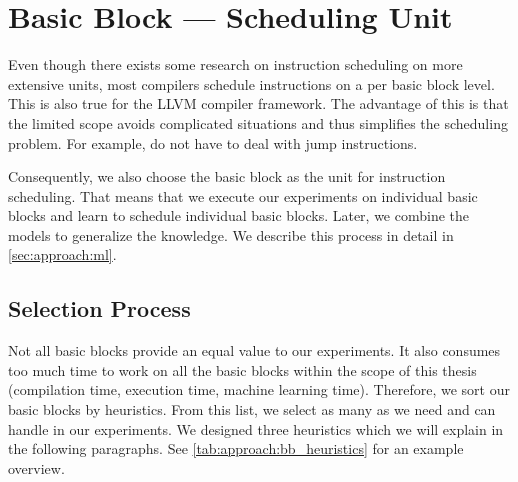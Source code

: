 \section{Basic Block --- Scheduling Unit}
\label{sec:approach:basicblock}
Even though there exists some research  on instruction scheduling on more extensive units, most compilers schedule instructions on a per basic block level.
This is also true for the LLVM compiler framework.
The advantage of this is that the limited scope avoids complicated situations and thus simplifies the scheduling problem.
For example, do not have to deal with jump instructions.

Consequently, we also choose the basic block as the unit for instruction scheduling.
That means that we execute our experiments on individual basic blocks and learn to schedule individual basic blocks.
Later, we combine the models to generalize the knowledge.
We describe this process in detail in \cref{sec:approach:ml}.

\subsection{Selection Process}
\label{sec:approach:basicblock:selection}
Not all basic blocks provide an equal value to our experiments.
It also consumes too much time to work on all the basic blocks within the scope of this thesis (\eg compilation time, execution time, machine learning time).
Therefore, we sort our basic blocks by heuristics. 
From this list, we select as many as we need and can handle in our experiments.
We designed three heuristics which we will explain in the following paragraphs.
See \cref{tab:approach:bb_heuristics} for an example overview.

